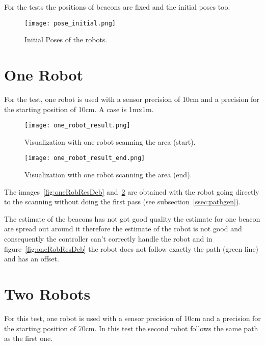 For the tests the positions of beacons are fixed and the initial poses too.

\begin{figure}[H]
\centering
\texttt{[image: pose\_initial.png]}
\caption{Initial Poses of the robots.}
\label{fig:initialPose}
\end{figure}

\section{One Robot}

For the test, one robot is used with a sensor precision of 10cm  and a precision for the starting position of 10cm. A case is 1mx1m.

\begin{figure}[H]
\centering
\begin{minipage}[b]{0.4\textwidth}
\texttt{[image: one\_robot\_result.png]}
\caption{Visualization with one robot scanning the area (start).}
\label{fig:oneRobResDeb}
\end{minipage}
\begin{minipage}[b]{0.4\textwidth}
\texttt{[image: one\_robot\_result\_end.png]}
\caption{Visualization with one robot scanning the area (end).}
\label{fig:oneRobResEnd}
\end{minipage}
\end{figure}

The images~\ref{fig:oneRobResDeb} and~\ref{fig:oneRobResEnd} are obtained with the robot going directly to the scanning without doing the first pass (see subsection~\ref{ssec:pathgen}).

The estimate of the beacons has not got good quality the estimate for one beacon are spread out around it therefore the estimate of the robot  is not good and consequently the controller can't correctly handle the robot and in figure~\ref{fig:oneRobResDeb} the robot does not follow exactly the path (green line) and has an offset.

\section{Two Robots}

For this test, one robot is used with a sensor precision of 10cm  and a precision for the starting position of 70cm. In this test the second robot follows the same path as the first one.

